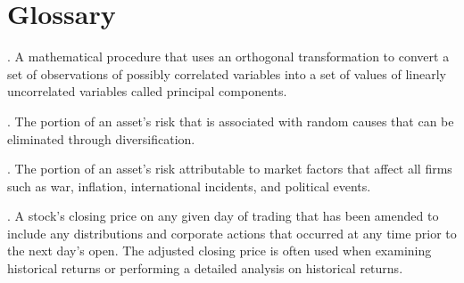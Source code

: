 \documentclass[oneside,12pt]{report}
\begin{document}
\chapter{Glossary}\label{Glossary}

\vspace{12pt} 

\vspace{8pt}
.  A mathematical procedure that uses an orthogonal transformation to convert a set of observations of possibly correlated variables into a set of values of linearly uncorrelated variables called principal components. 

\vspace{8pt}
. The portion of an asset’s risk that is associated with random causes that can be eliminated through diversification. 

\vspace{8pt}
. The portion of an asset’s risk attributable to market factors that affect all firms such as war, inflation, international incidents, and political events. 

\vspace{8pt}
. A stock's closing price on any given day of trading that has been amended to include any distributions and corporate actions that occurred at any time prior to the next day's open. The adjusted closing price is often used when examining historical returns or performing a detailed analysis on historical returns.

%
%
%
%
%
%
%
\end{document}
